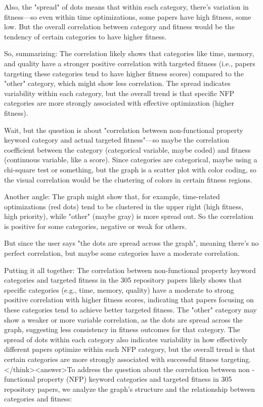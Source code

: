 Also, the "spread" of dots means that within each category, there's variation in fitness—so even within time optimizations, some papers have high fitness, some low. But the overall correlation between category and fitness would be the tendency of certain categories to have higher fitness. 

So, summarizing: The correlation likely shows that categories like time, memory, and quality have a stronger positive correlation with targeted fitness (i.e., papers targeting these categories tend to have higher fitness scores) compared to the "other" category, which might show less correlation. The spread indicates variability within each category, but the overall trend is that specific NFP categories are more strongly associated with effective optimization (higher fitness). 

Wait, but the question is about "correlation between non-functional property keyword category and actual targeted fitness"—so maybe the correlation coefficient between the category (categorical variable, maybe coded) and fitness (continuous variable, like a score). Since categories are categorical, maybe using a chi-square test or something, but the graph is a scatter plot with color coding, so the visual correlation would be the clustering of colors in certain fitness regions. 

Another angle: The graph might show that, for example, time-related optimizations (red dots) tend to be clustered in the upper right (high fitness, high priority), while "other" (maybe gray) is more spread out. So the correlation is positive for some categories, negative or weak for others. 

But since the user says "the dots are spread across the graph", meaning there's no perfect correlation, but maybe some categories have a moderate correlation. 

Putting it all together: The correlation between non-functional property keyword categories and targeted fitness in the 305 repository papers likely shows that specific categories (e.g., time, memory, quality) have a moderate to strong positive correlation with higher fitness scores, indicating that papers focusing on these categories tend to achieve better targeted fitness. The "other" category may show a weaker or more variable correlation, as the dots are spread across the graph, suggesting less consistency in fitness outcomes for that category. The spread of dots within each category also indicates variability in how effectively different papers optimize within each NFP category, but the overall trend is that certain categories are more strongly associated with successful fitness targeting.</think><answer>To address the question about the correlation between non - functional property (NFP) keyword categories and targeted fitness in 305 repository papers, we analyze the graph’s structure and the relationship between categories and fitness:  


